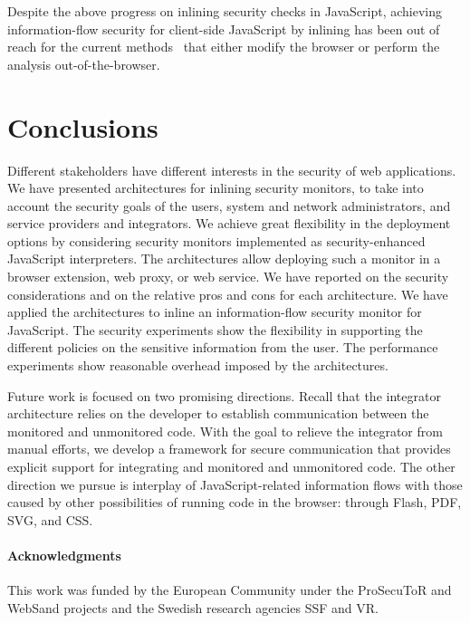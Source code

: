 \documentclass{llncs}
\begin{document}
Despite the above progress on inlining security checks in JavaScript, achieving
information-flow security for client-side JavaScript by inlining has been out of
reach for the current methods~\cite{Vogt+:NDSS07,DBLP:conf/pldi/ChughMJL09,Yip:Narula:Krohn:Morris:EUROSYS09,Jang+:CCS10,DeGroef+:CCS12}  that either
modify the browser or perform the analysis out-of-the-browser.

\section{Conclusions}
\label{sec:conc}
Different stakeholders have different interests in the security of web
applications. We have presented architectures for inlining security
monitors, to take into account the security goals of the users, system and
network administrators, and service providers and integrators.
%
We achieve great flexibility in the deployment options by considering
security monitors implemented as security-enhanced JavaScript interpreters.
%
The architectures allow deploying such a monitor in a browser
extension, web proxy, or web service.
%
We have reported on the security considerations and on the relative pros and
cons for each architecture.
%
We have applied the architectures to inline an information-flow
security monitor for JavaScript.
%
The security experiments show the
flexibility in supporting the different policies on the sensitive
information from the user. 
%
The performance experiments show reasonable overhead imposed by the
architectures.

Future work is focused on two promising directions. Recall that the
integrator architecture relies on the developer to establish
communication between the monitored and unmonitored code. With the
goal to relieve the integrator from manual efforts, we develop a
framework for secure communication that provides explicit support for
integrating and monitored and unmonitored code.
%
The other direction we pursue is interplay of JavaScript-related
information flows with those caused by other possibilities of running
code in the browser: through Flash, PDF, SVG, and CSS.

\paragraph{Acknowledgments}
This work was funded by 
the European Community under the ProSecuToR and WebSand projects
and
the Swedish research agencies SSF and VR.




\end{document}
